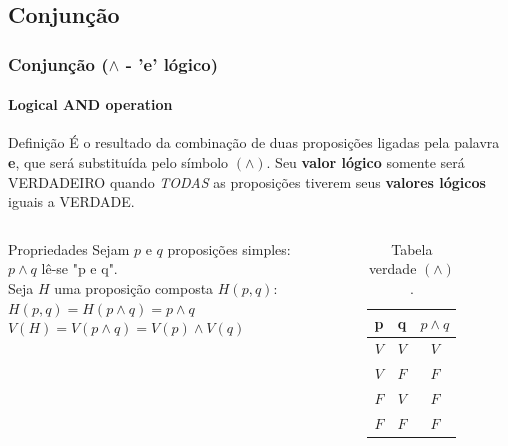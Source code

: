 \documentclass[10pt, headsepline, captions=tableabove,xcolor=table]{beamer}
\begin{document}
\subsection{Conjunção}
%

\begin{frame}[t]
    \frametitle{Conjunção ($\land$ - 'e' lógico)}
    \framesubtitle{Logical AND operation}
    \begin{block}{Definição}
        É o resultado da combinação de duas proposições ligadas pela palavra \textbf{e}, que será substituída pelo símbolo $(\land)$. Seu \textbf{valor lógico} somente será VERDADEIRO quando \emph{TODAS} as proposições tiverem seus \textbf{valores lógicos} iguais a VERDADE.
    \end{block}
    \vspace{-4mm}
    \begin{columns}[t]
        \begin{column}{0.58\textwidth}
            \begin{alertblock}{Propriedades}
                Sejam $p$ e $q$ proposições simples: \\[2pt]
                $p \land q$ lê-se "p e q". \\[2pt]
                Seja $H$ uma proposição composta $H(p,q)$: \\[2pt]
                $H(p,q) = H(p \land q) = p \land q$ \\[2pt]
                $V(H) = V(p \land q) = V(p) \land V(q)$
            \end{alertblock}
        \end{column}
        \hspace{-10mm}
        \begin{column}{0.4\textwidth}
            \vspace{-3mm}
            \begin{table}[t]
                \caption{Tabela verdade $(\land)$.}
                \label{tab:table-and}
                \begin{tabular}{|c|c|c|}
                \hline
                \rowcolor[HTML]{EFEFEF} 
                \textbf{p} & \textbf{q} & \textbf{$p \land q$} \\ \hline
                $V$          & $V$          & $V$                    \\ \hline
                $V$          & $F$          & $F$                    \\ \hline
                $F$          & $V$          & $F$                   \\ \hline
                $F$          & $F$          & $F$                    \\ \hline
                \end{tabular}
            \end{table}
        \end{column}
    \end{columns}
\end{frame}
\end{document}
